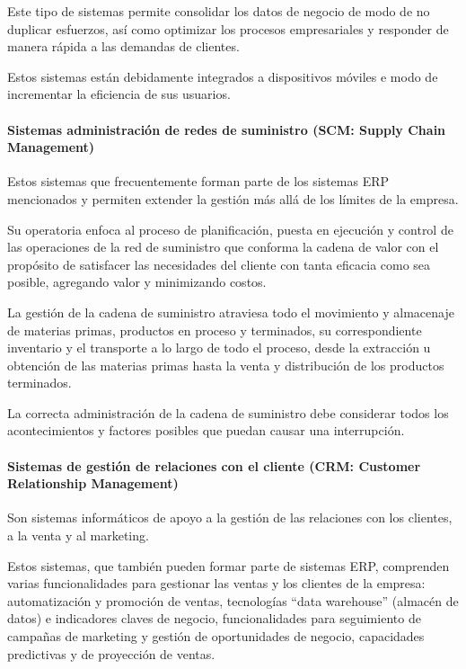 \documentclass[a4paper, 12pt]{article}
\begin{document}
Este tipo de sistemas permite consolidar los datos de negocio de modo de no duplicar esfuerzos, así como optimizar los procesos empresariales y responder de manera rápida a las demandas de clientes.

Estos sistemas están debidamente integrados a dispositivos móviles e modo de incrementar la eficiencia de sus usuarios.

\paragraph{Sistemas   administración   de   redes   de suministro (SCM: Supply Chain Management)}
Estos sistemas que frecuentemente forman parte de los sistemas ERP mencionados y permiten extender la gestión más allá de los límites de la empresa. 

Su operatoria enfoca al proceso de planificación, puesta en ejecución y control de las operaciones de la red de suministro que conforma la cadena de valor con el propósito de satisfacer las necesidades del cliente con tanta eficacia como sea posible, agregando valor y minimizando costos.

La gestión de la cadena de suministro atraviesa todo el movimiento y almacenaje de materias primas, productos en proceso y terminados, su correspondiente inventario y el transporte a lo largo de todo el proceso, desde la extracción u obtención de las materias primas hasta la venta y distribución de los productos terminados.

La correcta administración de la cadena de suministro debe considerar todos los acontecimientos y factores posibles que puedan causar una interrupción.

\paragraph{Sistemas de gestión de relaciones con el cliente (CRM: Customer Relationship Management)}

Son sistemas informáticos de apoyo a la gestión de las relaciones con los clientes, a la venta y al marketing.

Estos sistemas, que también pueden formar parte de sistemas ERP, comprenden varias funcionalidades para gestionar las ventas y los clientes de la empresa: automatización y promoción de ventas, tecnologías “data warehouse” (almacén de datos) e indicadores claves de negocio, funcionalidades para seguimiento de campañas de marketing y gestión de oportunidades de negocio, capacidades predictivas y de proyección de ventas.
\end{document}
